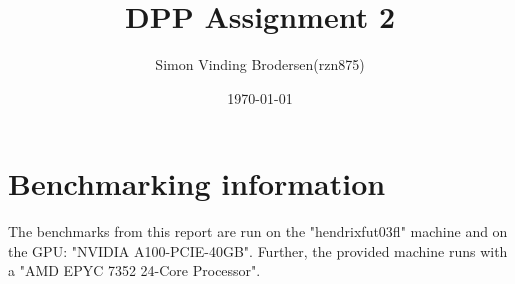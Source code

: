 \documentclass{article}
\title{DPP Assignment 2}
\author{Simon Vinding Brodersen(rzn875)}
\date{\today}
\begin{document}
\maketitle

\section*{Benchmarking information}
The benchmarks from this report are run on the "hendrixfut03fl" machine and on
the GPU: "NVIDIA A100-PCIE-40GB". Further, the provided machine runs with a
"AMD EPYC 7352 24-Core Processor".





\end{document}
